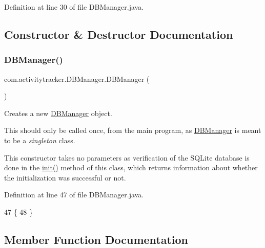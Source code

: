 Definition at line 30 of file D\+B\+Manager.\+java.



\subsection{Constructor \& Destructor Documentation}
\mbox{\label{classcom_1_1activitytracker_1_1_d_b_manager_ac1f558ef56fe02d74fe103a473a15bb5}} 
\subsubsection{\texorpdfstring{D\+B\+Manager()}{DBManager()}}
{\footnotesize\ttfamily com.\+activitytracker.\+D\+B\+Manager.\+D\+B\+Manager (\begin{DoxyParamCaption}{ }\end{DoxyParamCaption})\hspace{0.3cm}{\ttfamily [package]}}

Creates a new \mbox{\hyperlink{classcom_1_1activitytracker_1_1_d_b_manager}{D\+B\+Manager}} object.

This should only be called once, from the main program, as \mbox{\hyperlink{classcom_1_1activitytracker_1_1_d_b_manager}{D\+B\+Manager}} is meant to be a {\itshape singleton} class.

This constructor takes no parameters as verification of the S\+Q\+Lite database is done in the \mbox{\hyperlink{classcom_1_1activitytracker_1_1_d_b_manager_a41df4600bb5901a26a4ea6a7108a70b9}{init()}} method of this class, which returns information about whether the initialization was successful or not. 

Definition at line 47 of file D\+B\+Manager.\+java.


\begin{DoxyCode}
47                 \{
48     \}
\end{DoxyCode}


\subsection{Member Function Documentation}
\mbox{\label{classcom_1_1activitytracker_1_1_d_b_manager_ac390a33d3547306b250c8a9ed370997c}} 
